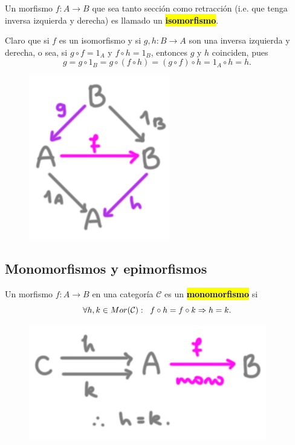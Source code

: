 \documentclass[10pt]{article}
\newcommand{\hlgray}[1]{{\sethlcolor{Ivory2}\hl{#1}}}
\newtheorem[M]{teo}{Teorema}[section]
\newtheorem[M]{listaObj}[teo]{Lista de deseos}
\newtheorem[M]{preg}[teo]{Pregunta}
\newtheorem[M]{lema}[teo]{Lema}
\newtheorem[M]{hip}[teo]{Hipótesis}
\newtheorem[M]{prop}[teo]{Proposición}
\newtheorem[M]{obs}[teo]{Observación}
\newtheorem[M]{cor}[teo]{Corolario}
\newtheorem[M]{notacion}[teo]{Notación}
\newtheorem[M]{nota}[teo]{Nota}
\begin{document}
\begin{defi}
Un morfismo $f: A \longrightarrow B$ que sea tanto
sección como retracción 
(i.e. que tenga inversa izquierda y derecha)
es llamado un \textbf{\hlgray{isomorfismo}}.
\end{defi}
\begin{minipage}{0.5\textwidth}
Claro que si $f$ es un isomorfismo y si 
$g, h: B \longrightarrow A$ son una inversa izquierda
y derecha, o sea, si $g \circ f = 1_{A}$ y 
$f \circ h = 1_{B}$, entonces $g$ y $h$ coinciden, pues
\[
g = g \circ 1_{B} = g \circ (f \circ h) = (g \circ f) \circ h
= 1_{A} \circ h = h.
\]
\end{minipage} \hfill
\begin{minipage}{0.45\textwidth}
\begin{figure}[H]
\centering
	\includegraphics[scale=2.5]{cat3} 
 \end{figure}
\end{minipage}

\subsection{Monomorfismos y epimorfismos}

\begin{minipage}{0.5\textwidth}
\begin{defi}
Un morfismo $f: A \longrightarrow B$ en una categoría 
$\mathcal{C}$ es un \textbf{\hlgray{monomorfismo}} si
\[
\forall h, k \in Mor(\mathcal{C}): \hspace{0.2cm}
f \circ h = f \circ k \Rightarrow h = k.
\]
\end{defi}
\end{minipage} \hfill
\begin{minipage}{0.45\textwidth}

\begin{figure}[H]
\centering
	\includegraphics[scale=2.5]{cat4} 
 \end{figure}
\end{minipage}
\end{document}
